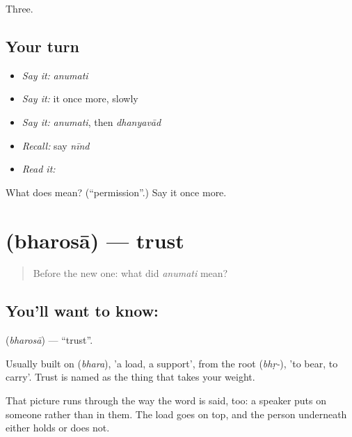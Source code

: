 \begin{grammarlens}[title={What you've built}]
Three.
\end{grammarlens}

\subsection*{Your turn}
\begin{itemize}
\raggedright
  \item \emph{Say it:} \emph{anumati}
  \item \emph{Say it:} it once more, slowly
  \item \emph{Say it:} \emph{anumati}, then \emph{dhanyavād}
  \item \emph{Recall:} say \emph{nīnd}
  \item \emph{Read it:} \textbf{}
\end{itemize}

\begin{tcolorbox}[breakable,colback=teal!4,colframe=teal!35!black,title={Before you move on}]
What does  mean? (\textquotedblleft{}permission\textquotedblright{}.) Say it once more.
\end{tcolorbox}
\section[\texorpdfstring{\hi{भरोसा} (bharosā)}{भरोसा (bharosā)}]{ (bharosā) — trust}

\label{lesson:HI-C65-trust}



\begin{quote}
Before the new one: what did \emph{anumati} mean?
\end{quote}

\subsection*{You'll want to know: }
\textbf{} (\emph{bharosā}) — \textquotedblleft{}trust\textquotedblright{}.

Usually built on  (\emph{bhara}), 'a load, a support', from the root  (\emph{bhṛ-}), 'to bear, to carry'. Trust is named as the thing that takes your weight.

That picture runs through the way the word is said, too: a speaker puts  on someone rather than in them. The load goes on top, and the person underneath either holds or does not.

